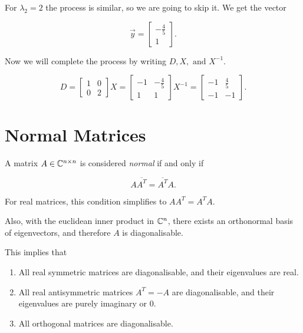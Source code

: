 For \(\lambda_2 = 2\) the process is similar, so we are going to skip it. We get the vector

\[
    \vec{y} = \begin{bmatrix}
        -\frac{4}{5} \\ 1
    \end{bmatrix}.
\]

Now we will complete the process by writing \(D, X, \text{ and } X^{-1}\).

\[
    D = \begin{bmatrix}
        1 & 0 \\
        0 & 2
    \end{bmatrix}
    X = \begin{bmatrix}
        -1  & -\frac{4}{5} \\
        1   &   1 
    \end{bmatrix}
    X^{-1} = \begin{bmatrix}
        -1  & \frac{4}{5} \\
        -1   &   -1 
    \end{bmatrix}.
\]

\section{Normal Matrices}

A matrix \(A \in \mathbb{C}^{n \times n}\) is considered \emph{normal} if and only if 

\[
    A \overline{A^T} = \overline{A^T} A.
\]  

For real matrices, this condition simplifies to \(A A^T = A^T A\). 

Also, with the euclidean inner product in \(\mathbb{C}^n\), there exists an orthonormal basis 
of eigenvectors, and therefore \(A\) is diagonalisable.

This implies that

\begin{enumerate}
    
    \item All real symmetric matrices are diagonalisable, and their eigenvalues are real.
    
    \item All real antisymmetric matrices \(A^T = -A\) are diagonalisable, and their eigenvalues are 
          purely imaginary or 0. 

    \item All orthogonal matrices are diagonalisable.

\end{enumerate}

